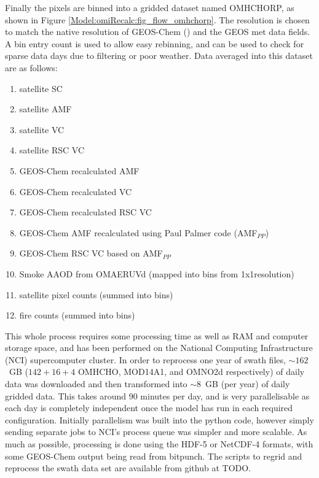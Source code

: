     Finally the pixels are binned into a gridded dataset named OMHCHORP, as shown in Figure \ref{Model:omiRecalc:fig_flow_omhchorp}.
    The resolution is chosen to match the native resolution of GEOS-Chem (\highhr) and the GEOS met data fields.
    A bin entry count is used to allow easy rebinning, and can be used to check for sparse data days due to filtering or poor weather.
    Data averaged into this dataset are as follows:
    \begin{enumerate}
      \item satellite SC %
      \item satellite AMF %
      \item satellite VC %
      \item satellite RSC VC %
      \item GEOS-Chem recalculated AMF %
      \item GEOS-Chem recalculated VC %
      \item GEOS-Chem recalculated RSC VC %
      \item GEOS-Chem AMF recalculated using Paul Palmer code (AMF$_{PP}$)
      \item GEOS-Chem RSC VC based on AMF$_{PP}$
      \item Smoke AAOD from OMAERUVd (mapped into bins from 1x1\degr resolution)
      \item satellite pixel counts (summed into bins)
      \item fire counts (summed into bins)
    \end{enumerate}
    
    This whole process requires some processing time as well as RAM and computer storage space, and has been performed on the National Computing Infrastructure (NCI) supercomputer cluster.
    In order to reprocess one year of swath files, $\sim 162$~GB ($142 + 16 + 4$ OMHCHO, MOD14A1, and OMNO2d respectively) of daily data was downloaded and then transformed into $\sim 8$~GB (per year) of daily gridded data.
    This takes around 90 minutes per day, and is very parallelisable as each day is completely independent once the model has run in each required configuration.
    Initially parallelism was built into the python code, however simply sending separate jobs to NCI's process queue was simpler and more scalable.
    As much as possible, processing is done using the HDF-5 or NetCDF-4 formats, with some GEOS-Chem output being read from bitpunch.
    The scripts to regrid and reprocess the swath data set are available from github at TODO.
  
